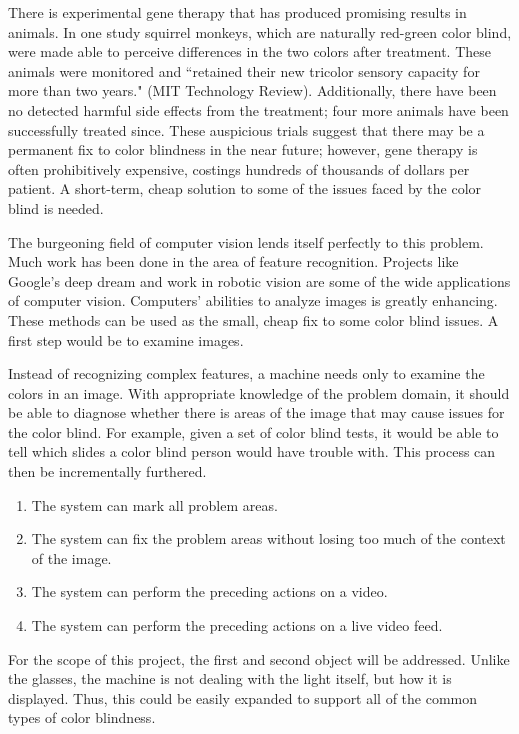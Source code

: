 \documentclass[12pt]{article}
\begin{document}
There is experimental gene therapy that has produced promising results in animals. In one study squirrel monkeys, which are naturally red-green color blind, were made able to perceive differences in the two colors after treatment. These animals were monitored and ``retained their new tricolor sensory capacity for more than two years." (MIT Technology Review). Additionally, there have been no detected harmful side effects from the treatment; four more animals have been successfully treated since. These auspicious trials suggest that there may be a permanent fix to color blindness in the near future; however, gene therapy is often prohibitively expensive, costings hundreds of thousands of dollars per patient. A short-term, cheap solution to some of the issues faced by the color blind is needed. 

The burgeoning field of computer vision lends itself perfectly to this problem. Much work has been done in the area of feature recognition. Projects like Google's deep dream and work in robotic vision are some of the wide applications of computer vision. Computers' abilities to analyze images is greatly enhancing. These methods can be used as the small, cheap fix to some color blind issues. A first step would be to examine images.

Instead of recognizing complex features, a machine needs only to examine the colors in an image. With appropriate knowledge of the problem domain, it should be able to diagnose whether there is areas of the image that may cause issues for the color blind. For example, given a set of color blind tests, it would be able to tell which slides a color blind person would have trouble with. This process can then be incrementally furthered.

\singlespacing
\begin{enumerate}
	\item The system can mark all problem areas.
	\item The system can fix the problem areas without losing too much of the context of the image.
	\item The system can perform the preceding actions on a video.
	\item The system can perform the preceding actions on a live video feed.
\end{enumerate}
\doublespacing

For the scope of this project, the first and second object will be addressed. Unlike the glasses, the machine is not dealing with the light itself, but how it is displayed. Thus, this could be easily expanded to support all of the common types of color blindness. 
\end{document}
